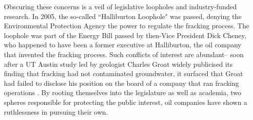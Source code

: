 \documentclass[12pt,letterpaper]{article}
\begin{document}
Obscuring these concerns is a veil of legislative loopholes and industry-funded research. In 2005, the so-called ``Halliburton Loophole" was passed, denying the Environmental Protection Agency the power to regulate the fracking process. The loophole was part of the Energy Bill passed by then-Vice President Dick Cheney, who happened to have been a former executive at Halliburton, the oil company that invented the fracking process. Such conflicts of interest are abundant-- soon after a UT Austin study led by geologist Charles Groat widely publicised its finding that fracking had not contaminated groundwater, it surfaced that Groat had failed to disclose his position on the board of a company that ran fracking operations \cite{groat}. By rooting themselves into the legislature as well as academia, two spheres responsible for protecting the public interest, oil companies have shown a ruthlessness in pursuing their own.

\makeworkscited
\end{document}
